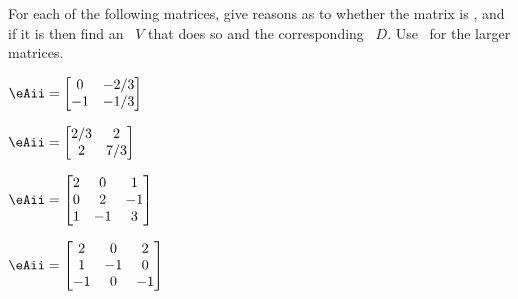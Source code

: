 \begin{exercise}  
For each of the following matrices, give reasons as to whether the matrix is , and if it is then find an ~\(V\) that does so and the corresponding ~\(D\).
Use \script\ for the larger matrices.

\begin{Parts}
\begin{reduce}
\item \(\eAii=\begin{bmatrix} 0&-2/3
\\-1&-1/3 \end{bmatrix}\)

\item \(\eAii=\begin{bmatrix} 2/3&2
\\2&7/3 \end{bmatrix}\)
\end{reduce}

\item \(\eAii=\begin{bmatrix} 2&0&1
\\0&2&-1
\\1&-1&3 \end{bmatrix}\)

\item \(\eAii=\begin{bmatrix} 2&0&2
\\1&-1&0
\\-1&0&-1 \end{bmatrix}\)


\end{Parts}
\end{exercise}
